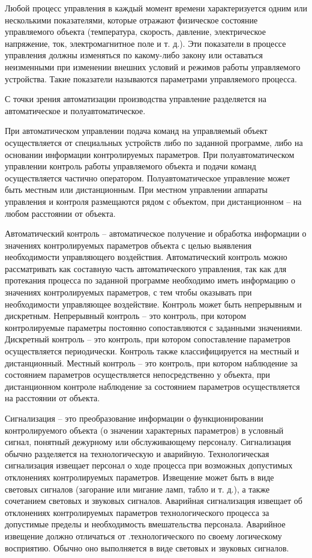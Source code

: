 Любой процесс управления в каждый момент времени характеризуется одним или несколькими показателями, которые отражают физическое состояние управляемого объекта (температура, скорость, давление, электрическое напряжение, ток, электромагнитное поле и т. д.). Эти показатели в процессе управления должны изменяться по какому-либо закону или оставаться неизменными при изменении внешних условий и режимов работы управляемого устройства. Такие показатели называются параметрами управляемого процесса.

С точки зрения автоматизации производства управление разделяется на автоматическое и полуавтоматическое.

При автоматическом управлении подача команд на управляемый объект осуществляется от специальных устройств либо по заданной программе, либо на основании информации контролируемых параметров. При полуавтоматическом управлении контроль работы управляемого объекта и подачи команд осуществляется частично оператором. Полуавтоматическое управление может быть местным или дистанционным. При местном управлении аппараты управления и контроля размещаются рядом с объектом, при дистанционном -- на любом расстоянии от объекта.

Автоматический контроль -- автоматическое получение и обработка информации о значениях контролируемых параметров объекта с целью выявления необходимости управляющего воздействия. Автоматический контроль можно рассматривать как составную часть автоматического управления, так как для протекания процесса по заданной программе необходимо иметь информацию о значениях контролируемых параметров, с тем чтобы оказывать при необходимости управляющее воздействие. Контроль может быть непрерывным и дискретным. Непрерывный контроль -- это контроль, при котором контролируемые параметры постоянно сопоставляются с заданными значениями. Дискретный контроль -- это контроль, при котором сопоставление параметров осуществляется периодически. Контроль также классифицируется на местный и дистанционный. Местный контроль -- это контроль, при котором наблюдение за состоянием параметров осуществляется непосредственно у объекта, при дистанционном контроле наблюдение за состоянием параметров осуществляется на расстоянии от объекта.

Сигнализация -- это преобразование информации о функционировании контролируемого объекта (о значении характерных параметров) в условный сигнал, понятный дежурному или обслуживающему персоналу. Сигнализация обычно разделяется на технологическую и аварийную. Технологическая сигнализация извещает персонал о ходе процесса при возможных допустимых отклонениях контролируемых параметров. Извещение может быть в виде световых сигналов (загорание или мигание ламп, табло и т. д.), а также сочетанием световых и звуковых сигналов. Аварийная сигнализация извещает об отклонениях контролируемых параметров технологического процесса за допустимые пределы и необходимость вмешательства персонала. Аварийное извещение должно отличаться от .технологического по своему логическому восприятию. Обычно оно выполняется в виде световых и звуковых сигналов.


